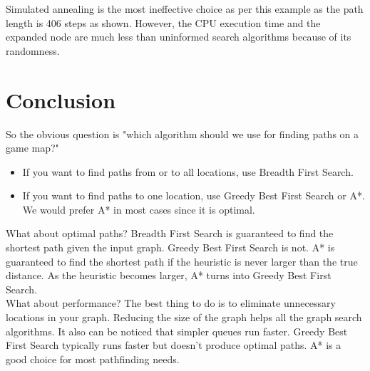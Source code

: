 \documentclass[a4paper]{article}
\begin{document}
\noindent Simulated annealing is the most ineffective choice as per this example as the path length is 406 steps as shown. However, the CPU execution time and the expanded node are much less than uninformed search algorithms because of its randomness.



\section{Conclusion}

So the obvious question is "which algorithm should we use for finding paths on a game map?"

\begin{itemize}
\item If you want to find paths from or to all locations, use Breadth First Search.
\item If you want to find paths to one location, use Greedy Best First Search or A*. We would prefer A* in most cases since it is optimal.
\end{itemize}

\noindent What about optimal paths? Breadth First Search is guaranteed to find the shortest path given the input graph. Greedy Best First Search is not. A* is guaranteed to find the shortest path if the heuristic is never larger than the true distance. As the heuristic becomes larger, A* turns into Greedy Best First Search.\\

\noindent What about performance? The best thing to do is to eliminate unnecessary locations in your graph. Reducing the size of the graph helps all the graph search algorithms. It also can be noticed that simpler queues run faster. Greedy Best First Search typically runs faster but doesn’t produce optimal paths. A* is a good choice for most pathfinding needs.

\newpage



%

%

\end{document}
